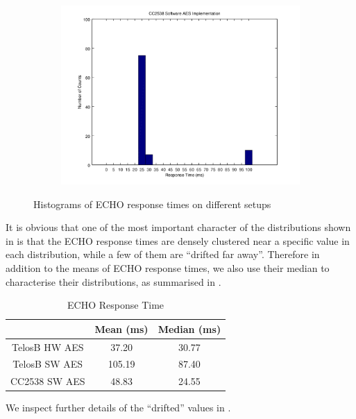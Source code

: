 \begin{figure}[ht!]
\begin{subfigure}{.5\textwidth}
		\includegraphics[width=1\linewidth]{fig/noncoresec_ping_cc2538_sw.png}
	\end{subfigure}
	\caption{Histograms of ECHO response times on different setups}
	\label{Fig: Histograms of ECHO response times on different setups}
\end{figure}

It is obvious that one of the most important character of the distributions shown in  is that the ECHO response times are densely clustered near a specific value in each distribution, while a few of them are ``drifted far away''. Therefore in addition to the means of ECHO response times, we also use their median to characterise their distributions, as summarised in .

\begin{table}[ht!]
	\center
	\begin{tabular}{|c|c|c|}
		\hline
		              & Mean (ms)     & Median (ms)   \\ \hline
		TelosB HW AES & 37.20 & 30.77 \\ \hline
		TelosB SW AES & 105.19        & 87.40          \\ \hline
		CC2538 SW AES & 48.83         & 24.55          \\ \hline
	\end{tabular}
	\caption{ECHO Response Time}
	\label{Tbl: ECHO Response Time}
\end{table}

We inspect further details of the ``drifted'' values in .


